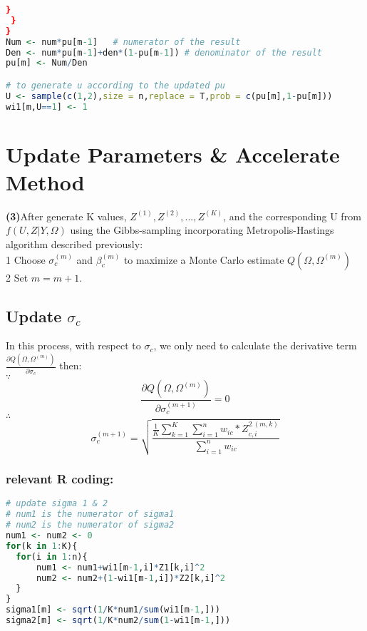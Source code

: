 \documentclass[10pt]{article}
\begin{document}
\begin{CJK}{UTF8}{gbsn}
\begin{lstlisting}[language=R]
  }
 }
}
Num <- num*pu[m-1]   # numerator of the result  
Den <- num*pu[m-1]+den*(1-pu[m-1]) # denominator of the result 
pu[m] <- Num/Den

# to generate u according to the updated pu
U <- sample(c(1,2),size = n,replace = T,prob = c(pu[m],1-pu[m]))
wi1[m,U==1] <- 1
\end{lstlisting}
\section{Update Parameters \& Accelerate Method}
\textbf{(3)}After generate K values, $Z^{(1)},Z^{(2)},...,Z^{(K)}$, and the corresponding U from $f(U,Z|Y,\Omega)$ using the Gibbs-sampling incorporating Metropolis-Hastings algorithm described previously:
\bigskip
\\1 Choose $\sigma_c^{(m)}$ and $\beta_c^{(m)}$ to maximize a Monte Carlo estimate $Q(\Omega,\Omega^{(m)})$
\\2 Set $m=m+1$.

\subsection{Update $\sigma_c$}
In this process, with respect to $\sigma_c$, we only need to calculate the derivative term $\frac{\partial Q(\Omega,\Omega^{(m)})}{\partial \sigma_c}$
then:
\\$\because$
\[\frac{\partial Q(\Omega,\Omega^{(m)})}{\partial \sigma_c^{(m+1)}}=0\]
$\therefore$
\[\sigma_c^{(m+1)}=\sqrt{\frac{\frac{1}{K}\sum_{k=1}^K\sum_{i=1}^nw_{ic}*Z^{2\ (m,k)}_{c,i}}{\sum_{i=1}^{n}w_{ic}}}\]
\subsubsection*{relevant R coding:}
\begin{lstlisting}[language=R]
# update sigma 1 & 2
# num1 is the numerator of sigma1
# num2 is the numerator of sigma2
num1 <- num2 <- 0
for(k in 1:K){
  for(i in 1:n){
      num1 <- num1+wi1[m-1,i]*Z1[k,i]^2
      num2 <- num2+(1-wi1[m-1,i])*Z2[k,i]^2
  }
}
sigma1[m] <- sqrt(1/K*num1/sum(wi1[m-1,]))
sigma2[m] <- sqrt(1/K*num2/sum(1-wi1[m-1,]))


\end{lstlisting}

\end{CJK}
\end{document}
